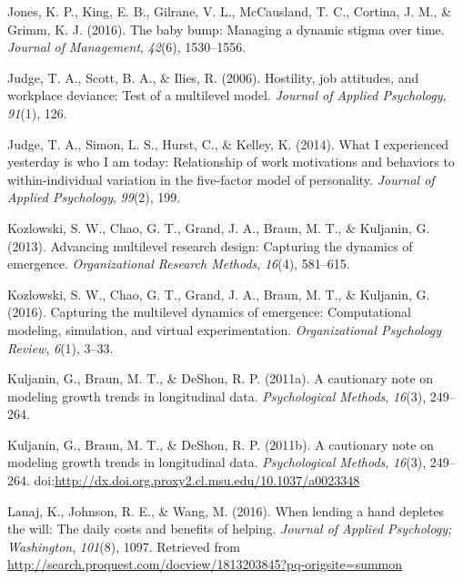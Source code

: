 \documentclass[english,,man]{apa6}
\theoremstyle{definition}
\theoremstyle{definition}
\theoremstyle{definition}
\theoremstyle{remark}
\begin{document}
\leavevmode\hypertarget{ref-jones_baby_2016}{}%
Jones, K. P., King, E. B., Gilrane, V. L., McCausland, T. C., Cortina,
J. M., \& Grimm, K. J. (2016). The baby bump: Managing a dynamic stigma
over time. \emph{Journal of Management}, \emph{42}(6), 1530--1556.

\leavevmode\hypertarget{ref-judge2006hostility}{}%
Judge, T. A., Scott, B. A., \& Ilies, R. (2006). Hostility, job
attitudes, and workplace deviance: Test of a multilevel model.
\emph{Journal of Applied Psychology}, \emph{91}(1), 126.

\leavevmode\hypertarget{ref-judge_what_2014}{}%
Judge, T. A., Simon, L. S., Hurst, C., \& Kelley, K. (2014). What I
experienced yesterday is who I am today: Relationship of work
motivations and behaviors to within-individual variation in the
five-factor model of personality. \emph{Journal of Applied Psychology},
\emph{99}(2), 199.

\leavevmode\hypertarget{ref-kozlowski_advancing_2013}{}%
Kozlowski, S. W., Chao, G. T., Grand, J. A., Braun, M. T., \& Kuljanin,
G. (2013). Advancing multilevel research design: Capturing the dynamics
of emergence. \emph{Organizational Research Methods}, \emph{16}(4),
581--615.

\leavevmode\hypertarget{ref-kozlowski_capturing_2016}{}%
Kozlowski, S. W., Chao, G. T., Grand, J. A., Braun, M. T., \& Kuljanin,
G. (2016). Capturing the multilevel dynamics of emergence: Computational
modeling, simulation, and virtual experimentation. \emph{Organizational
Psychology Review}, \emph{6}(1), 3--33.

\leavevmode\hypertarget{ref-kuljanin2011cautionary}{}%
Kuljanin, G., Braun, M. T., \& DeShon, R. P. (2011a). A cautionary note
on modeling growth trends in longitudinal data. \emph{Psychological
Methods}, \emph{16}(3), 249--264.

\leavevmode\hypertarget{ref-kuljanin_cautionary_2011}{}%
Kuljanin, G., Braun, M. T., \& DeShon, R. P. (2011b). A cautionary note
on modeling growth trends in longitudinal data. \emph{Psychological
Methods}, \emph{16}(3), 249--264.
doi:\href{https://doi.org/http://dx.doi.org.proxy2.cl.msu.edu/10.1037/a0023348}{http://dx.doi.org.proxy2.cl.msu.edu/10.1037/a0023348}

\leavevmode\hypertarget{ref-lanaj_when_2016}{}%
Lanaj, K., Johnson, R. E., \& Wang, M. (2016). When lending a hand
depletes the will: The daily costs and benefits of helping.
\emph{Journal of Applied Psychology; Washington}, \emph{101}(8), 1097.
Retrieved from
\url{http://search.proquest.com/docview/1813203845?pq-origsite=summon}
\end{document}
